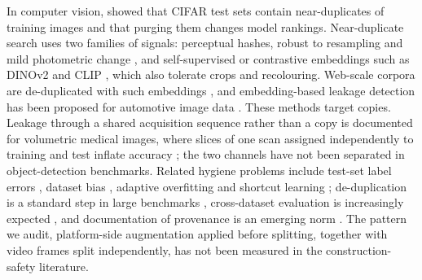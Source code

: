 \documentclass[review,12pt]{elsarticle}
\begin{document}
In computer vision, \citet{barz2020train} showed that CIFAR test sets
contain near-duplicates of training images and that purging them
changes model rankings. Near-duplicate search uses two families of
signals: perceptual hashes, robust to resampling and mild photometric
change \citep{farid2021perceptual}, and self-supervised or
contrastive embeddings such as DINOv2 \citep{oquab2024dinov2} and CLIP
\citep{radford2021clip}, which also tolerate crops and recolouring.
Web-scale corpora are de-duplicated with such embeddings
\citep{schuhmann2022laion}, and embedding-based leakage detection has
been proposed for automotive image data \citep{dlede2024leakage}.
These methods target copies. Leakage through a shared acquisition
sequence rather than a copy is documented for volumetric medical
images, where slices of one scan assigned independently to training and
test inflate accuracy \citep{yagis2021effect,tampu2022inflation}; the
two channels have not been separated in object-detection benchmarks.
Related hygiene problems include test-set label errors
\citep{northcutt2021labelerrors}, dataset bias
\citep{torralba2011unbiased}, adaptive overfitting
\citep{recht2019imagenet} and shortcut learning
\citep{geirhos2020shortcut}; de-duplication is a standard step in
large benchmarks \citep{lin2014coco,gupta2019lvis}, cross-dataset
evaluation is increasingly expected \citep{koh2021wilds,
zhou2022multidataset}, and documentation of provenance is an emerging
norm \citep{gebru2021datasheets,paullada2021data}. The pattern we
audit, platform-side augmentation \citep{shorten2019augmentation}
applied before splitting, together with video frames split
independently, has not been measured in the construction-safety
literature.
\end{document}
